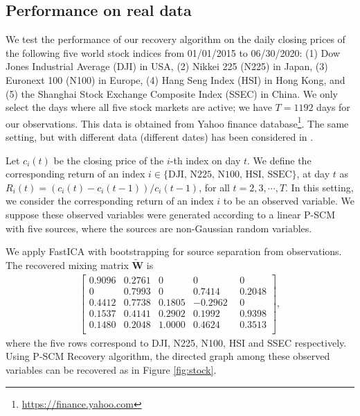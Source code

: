 \documentclass[12pt]{article}
\newcommand{\bW}{\mathbf{W}}
\begin{document}
\subsection{Performance on real data}
We test the performance of our recovery algorithm on the daily closing prices of the following five world stock indices from 01/01/2015 to 06/30/2020: (1) Dow Jones Industrial Average (DJI) in USA, (2) Nikkei 225 (N225) in Japan, (3) Euronext 100 (N100) in Europe, (4) Hang Seng Index (HSI) in Hong Kong, and (5) the Shanghai Stock Exchange Composite Index (SSEC) in China. We only select the days where all five stock markets are active; we have $T=1192$ days for our observations. This data is obtained from Yahoo finance database\footnote{\url{https://finance.yahoo.com}}. The same setting, but with different data (different dates) has been considered in \citep[Section 5.2]{salehkaleybar2020learning}.

Let $c_i(t)$ be the closing price of the $i$-th index on day $t$. We define the corresponding return of an index $i\in\{\text{DJI, N225, N100, HSI, SSEC}\}$, at day $t$ as $R_{i}(t)=\left(c_{i}(t)-c_{i}(t-1)\right)/c_{i}(t-1)$, for all $t=2,3,\cdots,T$. In this setting, we consider the corresponding return of an index $i$ to be an observed variable. We suppose these observed variables were generated according to a linear P-SCM with five sources, where the sources are non-Gaussian random variables. 

We apply FastICA  with bootstrapping for source separation from observations. The recovered mixing matrix $\tilde{\bW}$ is
\begin{align}
\begin{bmatrix}
0.9096 & 0.2761 & 0 & 0 & 0 \\
0 & 0.7993 & 0 & 0.7414 & 0.2048 \\
0.4412 & 0.7738 & 0.1805 & -0.2962\ ~ & 0 \\
0.1537 & 0.4141 & 0.2902 & 0.1992 & 0.9398 \\
0.1480 & 0.2048 & 1.0000 & 0.4624 & 0.3513 \\
\end{bmatrix}
,
\label{eq:stock}
\end{align}
where the five rows correspond to DJI, N225, N100, HSI and SSEC respectively. Using P-SCM Recovery algorithm, the directed graph among these observed variables can be recovered as in Figure \ref{fig:stock}.
\end{document}
